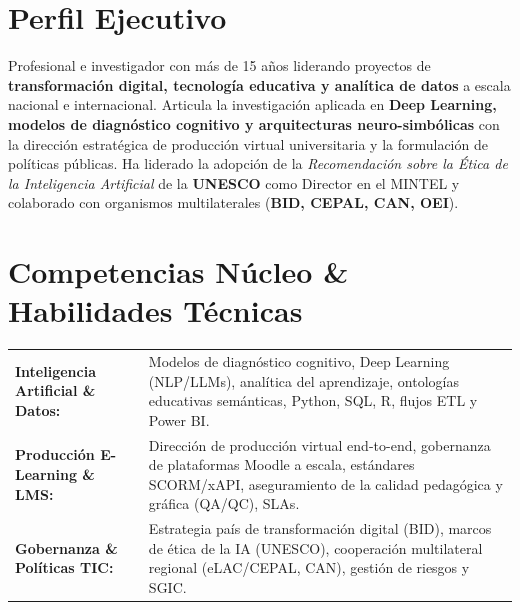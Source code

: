 \documentclass[10pt,a4paper]{article}
\begin{document}
\vspace{6pt}

\section{Perfil Ejecutivo}
Profesional e investigador con más de 15 años liderando proyectos de \textbf{transformación digital, tecnología educativa y analítica de datos} a escala nacional e internacional. Articula la investigación aplicada en \textbf{Deep Learning, modelos de diagnóstico cognitivo y arquitecturas neuro-simbólicas} con la dirección estratégica de producción virtual universitaria y la formulación de políticas públicas. Ha liderado la adopción de la \textit{Recomendación sobre la Ética de la Inteligencia Artificial} de la \textbf{UNESCO} como Director en el MINTEL y colaborado con organismos multilaterales (\textbf{BID, CEPAL, CAN, OEI}).

\vspace{5pt}

\section{Competencias Núcleo \& Habilidades Técnicas}
\begin{tabularx}{\textwidth}{@{}p{4.2cm} X@{}}
\textbf{\textcolor{primary}{Inteligencia Artificial \& Datos:}} & Modelos de diagnóstico cognitivo, Deep Learning (NLP/LLMs), analítica del aprendizaje, ontologías educativas semánticas, Python, SQL, R, flujos ETL y Power BI.\\
\textbf{\textcolor{primary}{Producción E-Learning \& LMS:}} & Dirección de producción virtual end-to-end, gobernanza de plataformas Moodle a escala, estándares SCORM/xAPI, aseguramiento de la calidad pedagógica y gráfica (QA/QC), SLAs.\\
\textbf{\textcolor{primary}{Gobernanza \& Políticas TIC:}} & Estrategia país de transformación digital (BID), marcos de ética de la IA (UNESCO), cooperación multilateral regional (eLAC/CEPAL, CAN), gestión de riesgos y SGIC.\\
\end{tabularx}

\vspace{5pt}
\end{document}
